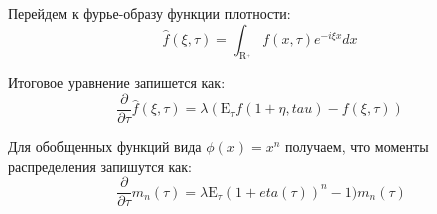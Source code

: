 Перейдем к фурье-образу функции плотности:
\begin{equation}
    \hat{f}(\xi,\tau) = \int_{\mathrm{R}^_+} f(x,\tau) e^{-i \xi x} dx
\end{equation}

Итоговое уравнение запишется как:
\begin{equation}
    \frac{\partial}{\partial \tau} \hat{f}(\xi,\tau) = \lambda (\mathrm{E}_\tau f(1+\eta,
    tau) - f(\xi,\tau))
\end{equation}

Для обобщенных функций вида $\phi(x)=x^n$ получаем, что 
моменты распределения запишутся как:
\begin{equation}\
    \frac{\partial}{\partial \tau} m_n(\tau) = \lambda \mathrm{E}_\tau (1+eta(\tau))^n -1) m_n(\tau)
\end{equation}